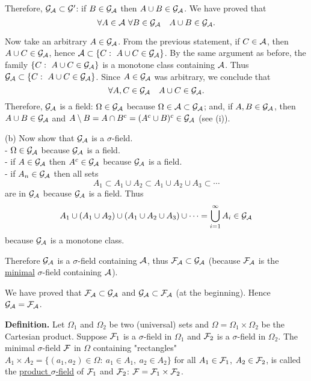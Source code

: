 \documentclass[a4paper,10pt]{article}
\newcommand{\1}[1]{\mathbf{1}_{\{#1\}}}
\begin{document}
Therefore, ${\cal G_A}\subset {\cal G}'$: if $B\in{\cal G_A}$ then $A\cup B\in{\cal G_A}$. We have proved that
  $$\forall A\in{\cal A}~\forall B\in{\cal G_A}~~~A\cup B\in{\cal G_A}.$$

Now take an arbitrary $A\in{\cal G_A}$. From the previous statement, if $C\in{\cal A}$, then $A\cup C\in{\cal G_A}$, hence ${\cal A}\subset \{C:~A\cup C\in{\cal G_A}\}$. By the same argument as before, the family $\{C:~A\cup C\in{\cal G_A}\}$ is a monotone class containing $\cal A$. Thus ${\cal G_A}\subset \{C:~A\cup C\in{\cal G_A}\}$. Since $A\in{\cal G_A}$ was arbitrary, we conclude that
  $$\forall A,C\in{\cal G_A}~~~A\cup C\in{\cal G_A}.$$
Therefore, ${\cal G_A}$ is a field: $\Omega\in{\cal G_A}$ because $\Omega\in{\cal A}\subset{\cal G_A}$; and, if $A,B\in{\cal G_A}$, then $A\cup B\in{\cal G_A}$ and $A\setminus B=A\cap B^c=(A^c\cup B)^c\in{\cal G_A}$ (see (i)).

(b) Now show that $\cal G_A$ is a $\sigma$-field.\\
- $\Omega\in{\cal G_A}$ because $\cal G_A$ is a field.\\
- if $A\in{\cal G_A}$ then $A^c\in{\cal G_A}$ because $\cal G_A$ is a field.\\
- if $A_n\in{\cal G_A}$ then all sets
  $$A_1\subset A_1\cup A_2 \subset A_1\cup A_2\cup A_3 \subset \cdots$$
are in ${\cal G_A}$ because ${\cal G_A}$ is a field. Thus
  $$A_1\cup(A_1\cup A_2)\cup (A_1\cup A_2\cup A_3)\cup \cdots =\bigcup_{i=1}^\infty A_i\in{\cal G_A}$$
because $\cal G_A$ is a monotone class.

Therefore $\cal G_A$ is a $\sigma$-field containing $\cal A$, thus ${\cal F_A}\subset{\cal G_A}$ (because $\cal F_A$ is the \underline{minimal} $\sigma$-field containing $\cal A$).

We have proved that ${\cal F_A}\subset{\cal G_A}$ and ${\cal G_A}\subset{\cal F_A}$ (at the beginning). Hence ${\cal G_A}={\cal F_A}$. \blacksquare\vspace{5mm}

{\bf Definition.} Let $\Omega_1$ and $\Omega_2$ be two (universal) sets and $\Omega=\Omega_1\times\Omega_2$ be the Cartesian product. Suppose ${\cal F}_1$ is a $\sigma$-field in $\Omega_1$ and ${\cal F}_2$ is a $\sigma$-field in $\Omega_2$. The minimal $\sigma$-field $\cal F$ in $\Omega$ containing "rectangles" $A_1\times A_2=\{(a_1,a_2)\in\Omega:~a_1\in A_1,~a_2\in A_2\}$ for all $A_1\in{\cal F}_1$, $A_2\in{\cal F}_2$, is called the \underline{product $\sigma$-field} of ${\cal F}_1$ and ${\cal F}_2$: ${\cal F}={\cal F}_1\times{\cal F}_2$. \vspace{5mm}
\end{document}

